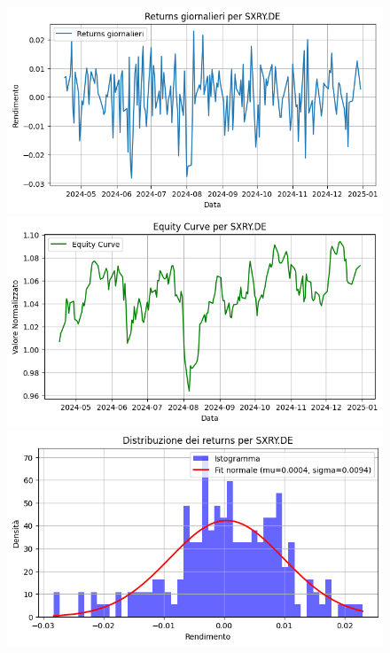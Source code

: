 \documentclass{article}%
\begin{document}
\begin{figure}[htbp]%
\begin{minipage}{0.31\textwidth}%
\includegraphics[width=\linewidth]{immagini_tickers/SXRY.DE_returns_plot.png}%
\end{minipage}%
\begin{minipage}{0.31\textwidth}%
\includegraphics[width=\linewidth]{immagini_tickers/SXRY.DE_equity_curve.png}%
\end{minipage}%
\begin{minipage}{0.31\textwidth}%
\includegraphics[width=\linewidth]{immagini_tickers/SXRY.DE_distribuzione_returns.png}%
\end{minipage}%
\end{figure}
\end{document}
